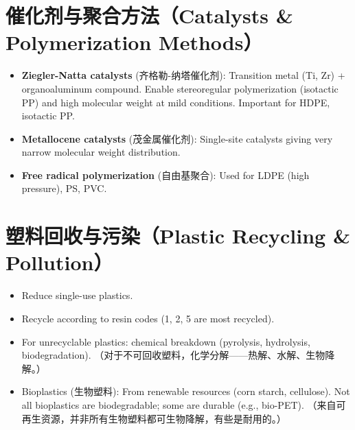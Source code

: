 \documentclass[12pt,a4paper]{ctexart}
\begin{document}
\section{催化剂与聚合方法（Catalysts \& Polymerization Methods）}
\begin{itemize}[leftmargin=*]
    \item \textbf{Ziegler-Natta catalysts} (齐格勒-纳塔催化剂): Transition metal (Ti, Zr) + organoaluminum compound. Enable stereoregular polymerization (isotactic PP) and high molecular weight at mild conditions. Important for HDPE, isotactic PP.
    \item \textbf{Metallocene catalysts} (茂金属催化剂): Single-site catalysts giving very narrow molecular weight distribution.
    \item \textbf{Free radical polymerization} (自由基聚合): Used for LDPE (high pressure), PS, PVC.
\end{itemize}

\section{塑料回收与污染（Plastic Recycling \& Pollution）}
\begin{itemize}[leftmargin=*]
    \item Reduce single-use plastics.
    \item Recycle according to resin codes (1, 2, 5 are most recycled).
    \item For unrecyclable plastics: chemical breakdown (pyrolysis, hydrolysis, biodegradation). （对于不可回收塑料，化学分解——热解、水解、生物降解。）
    \item Bioplastics (生物塑料): From renewable resources (corn starch, cellulose). Not all bioplastics are biodegradable; some are durable (e.g., bio-PET). （来自可再生资源，并非所有生物塑料都可生物降解，有些是耐用的。）
\end{itemize}
\end{document}
